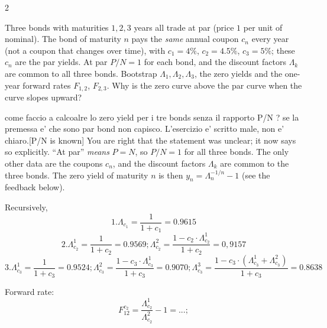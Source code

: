 \begin{paracol}{2}
\begin{exercise}
Three bonds with maturities $1,2,3$ years all trade at par (price $1$ per unit of nominal). The bond of
maturity $n$ pays the \emph{same} annual coupon $c_n$ every year (not a coupon that changes over time), with
$c_1 = 4\%$, $c_2 = 4.5\%$, $c_3 = 5\%$; these $c_n$ are the par yields. At par $P/N=1$ for each bond, and the
discount factors $\Lambda_k$ are common to all three bonds. Bootstrap $\Lambda_1,\Lambda_2,\Lambda_3$,
the zero yields and the one-year forward rates $F_{1,2}$, $F_{2,3}$. Why is the zero curve above the par curve
when the curve slopes upward?
\end{exercise}
\begin{mysolution}\begin{answer}{come faccio a calcoalre lo zero yield per i tre bonds senza il rapporto P/N ? se la premessa e' che sono par bond non capisco. L'esercizio e' scritto male, non e' chiaro.}[P/N is known]
You are right that the statement was unclear; it now says so explicitly. ``At par'' \emph{means} $P=N$,
so $P/N=1$ for all three bonds. The only other data are the coupons $c_n$, and the discount factors
$\Lambda_k$ are common to the three bonds. The zero yield of maturity $n$ is then $y_n=\Lambda_n^{-1/n}-1$
(see the feedback below).
\end{answer}
      Recursively, 
      \[ 1.  \Lambda_{c_1} = \frac{1}{1+c_1} = 0.9615\]
      \[ 2. \Lambda_{c_2}^1 = \frac{1}{1+c_2} = 0.9569 ; \Lambda_{c_2}^2 = \frac{1  -c_2 \cdot \Lambda_{c_2}^1}{1+c_2} = 0,9157\]
      \[ 3. \Lambda_{c_3}^1 = \frac{1}{1+c_3} = 0.9524 ; \Lambda_{c_3}^2 = \frac{1  - c_3 \cdot \Lambda_{c_3}^1}{1+c_3} = 0.9070 ; \Lambda_{c_3}^3 = \frac{1 - c_3 \cdot (\Lambda_{c_3}^1 + \Lambda_{c_3}^2)}{1+c_3} = 0.8638 \]
      
      Forward rate: \[F_{12}^{c_2} = \frac{\Lambda_{c_2}^1}{\Lambda_{c_2}^2} - 1 = ... ; \]
\end{mysolution}



\end{paracol}
